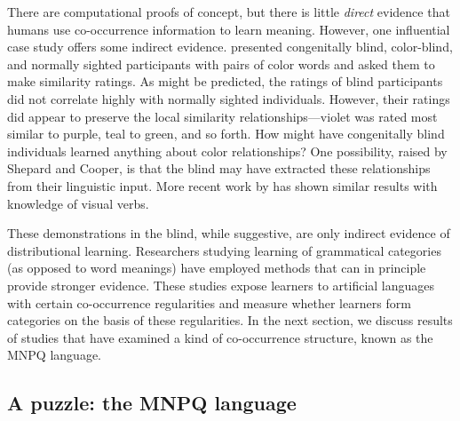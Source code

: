 \documentclass[man,floatsintext]{apa6}
\begin{document}
There are computational proofs of concept, but there is little \emph{direct} evidence that humans use co-occurrence information to learn meaning. However, one influential case study offers some indirect evidence. \citet{shepard1992} presented congenitally blind, color-blind, and normally sighted participants with pairs of color words and asked them to make similarity ratings. As might be predicted, the ratings of blind participants did not correlate highly with normally sighted individuals. However, their ratings did appear to preserve the local similarity relationships---violet was rated most similar to purple, teal to green, and so forth. How might have congenitally blind individuals learned anything about color relationships? One possibility, raised by Shepard and Cooper, is that the blind may have extracted these relationships from their linguistic input. More recent work by \citet{bedny2012} has shown similar results with knowledge of visual verbs.

These demonstrations in the blind, while suggestive, are only indirect evidence of distributional learning. Researchers studying learning of grammatical categories (as opposed to word meanings) have employed methods that can in principle provide stronger evidence. These studies expose learners to artificial languages with certain co-occurrence regularities and measure whether learners form categories on the basis of these regularities. In the next section, we discuss results of studies that have examined a kind of co-occurrence structure, known as the MNPQ language.

\subsection{A puzzle: the MNPQ language}
\end{document}
